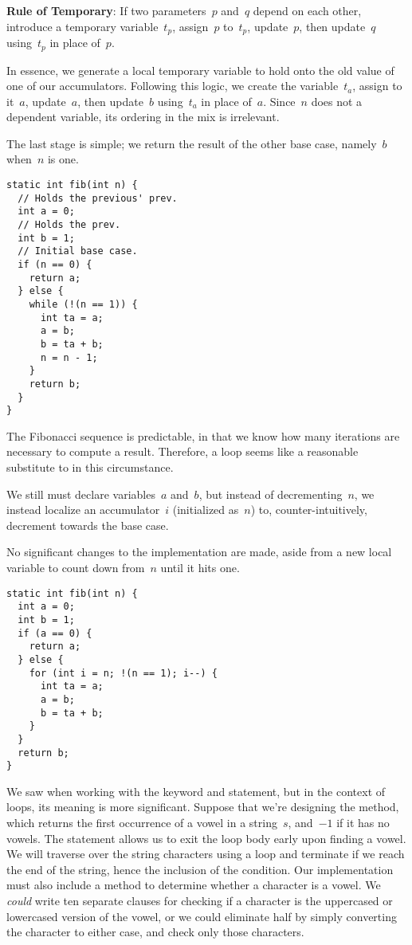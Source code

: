 \textbf{Rule of Temporary}: If two parameters~$p$ and~$q$ depend on each other, introduce a temporary variable~$t_p$, assign~$p$ to~$t_p$, update~$p$, then update~$q$ using~$t_p$ in place of~$p$.

In essence, we generate a local temporary variable to hold onto the old value of one of our accumulators. 
Following this logic, we create the variable~$t_a$, assign to it~$a$, update~$a$, then update~$b$ using~$t_a$ in place of~$a$. 
Since~$n$ does not a dependent variable, its ordering in the mix is irrelevant.

The last stage is simple; we return the result of the other base case, namely~$b$ when~$n$ is one.

\begin{lstlisting}[language=MyJava]
static int fib(int n) {
  // Holds the previous' prev.
  int a = 0;
  // Holds the prev.
  int b = 1;
  // Initial base case.
  if (n == 0) {
    return a;
  } else {
    while (!(n == 1)) {
      int ta = a;
      a = b;
      b = ta + b;
      n = n - 1;
    }
    return b;
  }
}
\end{lstlisting}

The Fibonacci sequence is predictable, in that we know how many iterations are necessary to compute a result. 
Therefore, a  loop seems like a reasonable substitute to  in this circumstance. 

We still must declare variables~$a$ and~$b$, but instead of decrementing~$n$, we instead localize an accumulator~$i$ (initialized as~$n$) to, counter-intuitively, decrement towards the base case. 

No significant changes to the implementation are made, aside from a new local variable to count down from~$n$ until it hits one.

\begin{lstlisting}[language=MyJava]
static int fib(int n) {
  int a = 0;
  int b = 1;
  if (a == 0) {
    return a;
  } else {
    for (int i = n; !(n == 1); i--) {
      int ta = a;
      a = b;
      b = ta + b;
    }
  }
  return b;
}
\end{lstlisting}

We saw  when working with the  keyword and statement, but in the context of loops, its meaning is more significant. 
Suppose that we're designing the  method, which returns the first occurrence of a vowel in a string~$s$, and~$-1$ if it has no vowels. 
The  statement allows us to exit the loop body early upon finding a vowel. 
We will traverse over the string characters using a  loop and terminate if we reach the end of the string, hence the inclusion of the  condition. 
Our implementation must also include a method to determine whether a character is a vowel. 
We \emph{could} write ten separate clauses for checking if a character is the uppercased or lowercased version of the vowel, or we could eliminate half by simply converting the character to either case, and check only those characters.

